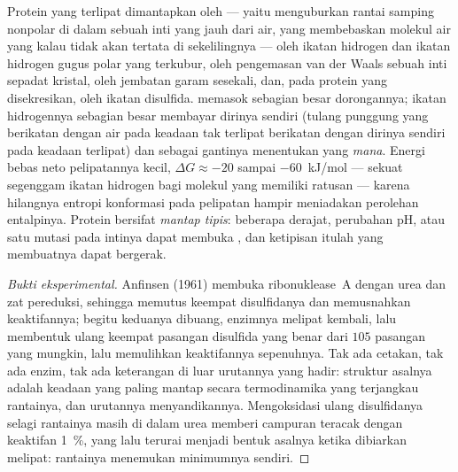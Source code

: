 \begin{proposition}\label{prop:b3:structural-biology:forces}
Protein yang terlipat dimantapkan oleh \emph{} --- yaitu
menguburkan rantai samping nonpolar di dalam sebuah inti yang jauh dari air,
yang membebaskan molekul air yang kalau tidak akan tertata di sekelilingnya ---
oleh ikatan hidrogen  dan ikatan hidrogen gugus polar yang
terkubur, oleh pengemasan van der Waals sebuah inti sepadat kristal, oleh
jembatan garam sesekali, dan, pada protein yang disekresikan, oleh ikatan
disulfida.  memasok sebagian besar dorongannya; ikatan
hidrogennya sebagian besar membayar dirinya sendiri (tulang punggung yang
berikatan dengan air pada keadaan tak terlipat berikatan dengan dirinya sendiri
pada keadaan terlipat) dan sebagai gantinya menentukan  yang \emph{mana}.
Energi bebas neto pelipatannya kecil, $\Delta G \approx -20$ sampai
\qty{-60}{kJ/mol} --- sekuat segenggam ikatan hidrogen bagi molekul yang
memiliki ratusan --- karena hilangnya entropi konformasi pada pelipatan
hampir meniadakan perolehan entalpinya. Protein bersifat \emph{mantap tipis}:
beberapa derajat, perubahan pH, atau satu mutasi pada intinya dapat
membuka , dan ketipisan itulah yang membuatnya dapat bergerak.
\end{proposition}

\begin{proof}[Bukti eksperimental]
Anfinsen (1961) membuka  ribonuklease~A dengan urea dan zat pereduksi,
sehingga memutus keempat disulfidanya dan memusnahkan keaktifannya; begitu
keduanya dibuang, enzimnya melipat kembali, lalu membentuk ulang keempat
pasangan disulfida yang benar dari $105$ pasangan yang mungkin, lalu memulihkan
keaktifannya sepenuhnya. Tak ada cetakan, tak ada enzim, tak ada keterangan di
luar urutannya yang hadir: struktur asalnya adalah keadaan yang paling mantap
secara termodinamika yang terjangkau rantainya, dan urutannya menyandikannya.
Mengoksidasi ulang disulfidanya selagi rantainya masih di dalam urea memberi
campuran teracak dengan keaktifan \qty{1}{\%}, yang lalu terurai menjadi
bentuk asalnya ketika dibiarkan melipat: rantainya menemukan minimumnya sendiri.
\end{proof}

